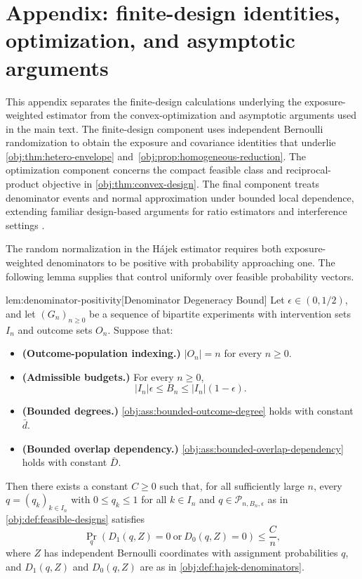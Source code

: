 \section{Appendix: finite-design identities, optimization, and asymptotic arguments}

This appendix separates the finite-design calculations underlying the exposure-weighted estimator from the convex-optimization and asymptotic arguments used in the main text. The finite-design component uses independent Bernoulli randomization to obtain the exposure and covariance identities that underlie \cref{obj:thm:hetero-envelope} and~\cref{obj:prop:homogeneous-reduction}. The optimization component concerns the compact feasible class and reciprocal-product objective in \cref{obj:thm:convex-design}. The final component treats denominator events and normal approximation under bounded local dependence, extending familiar design-based arguments for ratio estimators and interference settings \citep{HorvitzThompson1952,Hajek1964,LiuHudgens2014}.

The random normalization in the Hájek estimator requires both exposure-weighted denominators to be positive with probability approaching one. The following lemma supplies that control uniformly over feasible probability vectors.

\begin{lemmav}{lem:denominator-positivity}[Denominator Degeneracy Bound]
Let $\epsilon\in(0,1/2)$, and let $(G_n)_{n\geq 0}$ be a sequence of bipartite experiments with intervention sets $I_n$ and outcome sets $O_n$. Suppose that:

\begin{itemize}

\item \textbf{(Outcome-population indexing.)} $|O_n|=n$ for every $n\geq 0$.

\item \textbf{(Admissible budgets.)} For every $n\geq 0$,
\[
|I_n|\epsilon\leq B_n\leq |I_n|(1-\epsilon).
\]

\item \textbf{(Bounded degrees.)} \cref{obj:ass:bounded-outcome-degree} holds with constant $\bar d$.

\item \textbf{(Bounded overlap dependency.)} \cref{obj:ass:bounded-overlap-dependency} holds with constant $\bar D$.
\end{itemize}

Then there exists a constant $C\geq 0$ such that, for all sufficiently large $n$, every $q=(q_k)_{k\in I_n}$ with $0\leq q_k\leq1$ for all $k\in I_n$ and $q\in\mathcal P_{n,B_n,\epsilon}$ as in \cref{obj:def:feasible-designs} satisfies
\[
\Pr_q\!\left(D_1(q,Z)=0\ \text{or}\ D_0(q,Z)=0\right)
\leq \frac{C}{n},
\]
where $Z$ has independent Bernoulli coordinates with assignment probabilities $q$, and $D_1(q,Z)$ and $D_0(q,Z)$ are as in \cref{obj:def:hajek-denominators}.
\end{lemmav}


